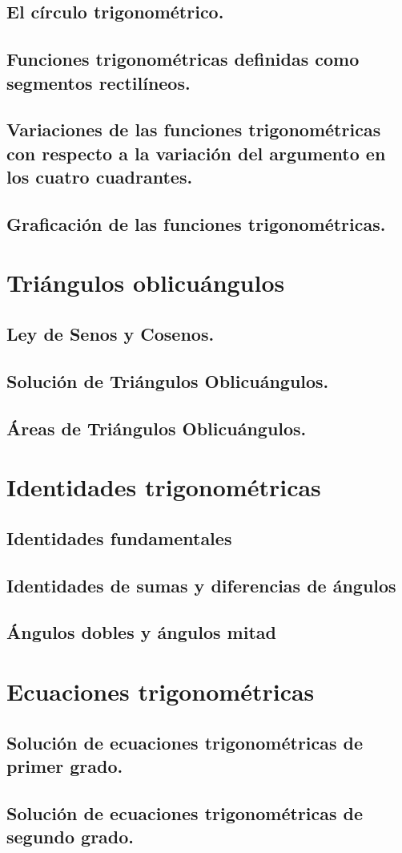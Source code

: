 \subsection{El círculo trigonométrico.}
\subsection{Funciones trigonométricas definidas como segmentos rectilíneos.}
\subsection{Variaciones de las funciones trigonométricas con respecto a la variación del argumento en los cuatro cuadrantes.}
\subsection{Graficación de las funciones trigonométricas. }

\section{Triángulos oblicuángulos}%
\subsection{Ley de Senos y Cosenos.}
\subsection{Solución de Triángulos Oblicuángulos.}
\subsection{Áreas de Triángulos Oblicuángulos. }






\section{Identidades trigonométricas}%
\subsection{Identidades fundamentales}
\subsection{Identidades de sumas y diferencias de ángulos}
\subsection{Ángulos dobles y ángulos mitad}





\section{Ecuaciones trigonométricas} %
\subsection{Solución de ecuaciones trigonométricas de primer grado.}
\subsection{Solución de ecuaciones trigonométricas de segundo grado.} 
